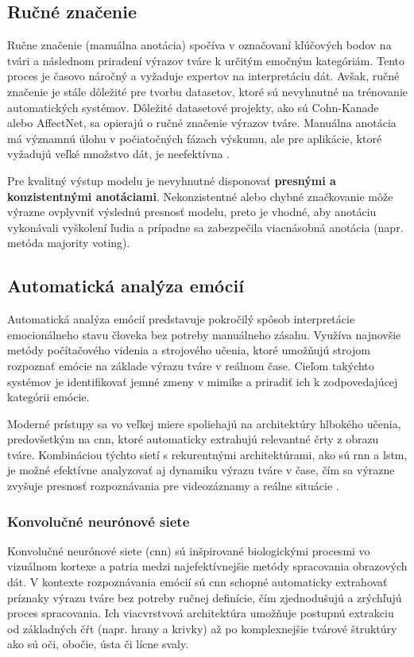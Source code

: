 \subsection{Ručné značenie}
Ručne značenie (manuálna anotácia) spočíva v označovaní kľúčových bodov na tvári a následnom priradení výrazov tváre k určitým emočným kategóriám. Tento proces je časovo náročný a vyžaduje expertov 
na interpretáciu dát. Avšak, ručné značenie je stále dôležité pre tvorbu datasetov, ktoré sú nevyhnutné na trénovanie automatických systémov. Dôležité datasetové projekty, ako sú Cohn-Kanade alebo AffectNet, 
sa opierajú o ručné značenie výrazov tváre. Manuálna anotácia má významnú úlohu v počiatočných fázach výskumu, ale pre aplikácie, ktoré vyžadujú veľké množstvo dát, je neefektívna \cite{article01}.

Pre kvalitný výstup modelu je nevyhnutné disponovať \textbf{presnými a konzistentnými anotáciami}. Nekonzistentné alebo chybné značkovanie môže výrazne ovplyvniť výslednú presnosť modelu, preto je vhodné, 
aby anotáciu vykonávali vyškolení ľudia a prípadne sa zabezpečila viacnásobná anotácia (napr. metóda majority voting).

\subsection{Automatická analýza emócií}

Automatická analýza emócií predstavuje pokročilý spôsob interpretácie emocionálneho stavu človeka bez potreby manuálneho zásahu. Využíva najnovšie metódy počítačového videnia a strojového učenia, ktoré umožňujú strojom rozpoznať emócie na základe výrazu tváre v reálnom čase. Cieľom takýchto systémov je identifikovať jemné zmeny v mimike a priradiť ich k zodpovedajúcej kategórii emócie.

Moderné prístupy sa vo veľkej miere spoliehajú na architektúry hlbokého učenia, predovšetkým na \gls{cnn}, ktoré automaticky extrahujú relevantné črty z obrazu tváre. Kombináciou týchto sietí s rekurentnými architektúrami, ako sú \gls{rnn} a \gls{lstm}, je možné efektívne analyzovať aj dynamiku výrazu tváre v čase, čím sa výrazne zvyšuje presnosť rozpoznávania pre videozáznamy a reálne situácie \cite{article01} \cite{misc01}.

\subsubsection{Konvolučné neurónové siete}

Konvolučné neurónové siete (\gls{cnn}) sú inšpirované biologickými procesmi vo vizuálnom kortexe a patria medzi najefektívnejšie metódy spracovania obrazových dát. V kontexte rozpoznávania emócií sú \gls{cnn} schopné automaticky extrahovať príznaky výrazu tváre bez potreby ručnej definície, čím zjednodušujú a zrýchľujú proces spracovania. Ich viacvrstvová architektúra umožňuje postupnú extrakciu od základných čŕt (napr. hrany a krivky) až po komplexnejšie tvárové štruktúry ako sú oči, obočie, ústa či lícne svaly.

